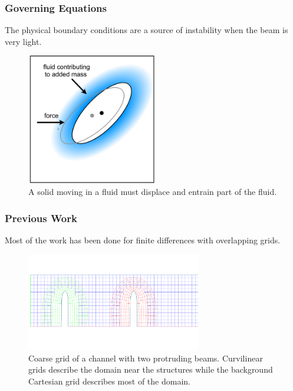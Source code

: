 \documentclass[8pt]{beamer}
\begin{document}
\begin{frame}
    \frametitle{Governing Equations}
    The physical boundary conditions are a source of instability when the beam
    is very light.

    \begin{figure}
        \centering
        \includegraphics[width=2.25in]{right.png}

        \caption{A solid moving in a fluid must displace and entrain part of the
        fluid.}
    \end{figure}
\end{frame}

\begin{frame}
    \frametitle{Previous Work}
    Most of the work has been done for finite differences with overlapping
    grids.

    \begin{figure}
        \centering

        \includegraphics[width=3in]{longfei.png}

        \caption{Coarse grid of a channel with two protruding beams. Curvilinear
        grids describe the domain near the structures while the background
        Cartesian grid describes most of the domain.}
    \end{figure}
\end{frame}
\end{document}
